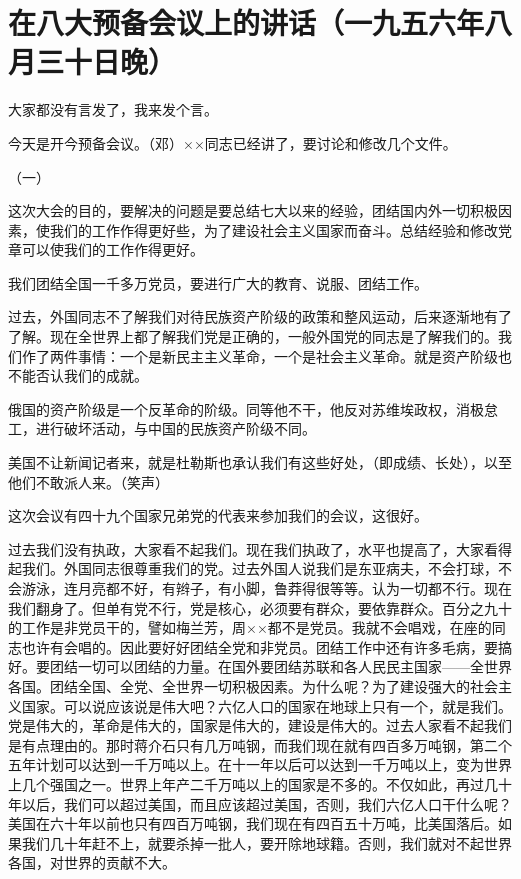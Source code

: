 \section[在八大预备会议上的讲话（一九五六年八月三十日晚）]{在八大预备会议上的讲话（一九五六年八月三十日晚）}


大家都没有言发了，我来发个言。

今天是开今预备会议。（邓）××同志已经讲了，要讨论和修改几个文件。

（一）

这次大会的目的，要解决的问题是要总结七大以来的经验，团结国内外一切积极因素，使我们的工作作得更好些，为了建设社会主义国家而奋斗。总结经验和修改党章可以使我们的工作作得更好。

我们团结全国一千多万党员，要进行广大的教育、说服、团结工作。

过去，外国同志不了解我们对待民族资产阶级的政策和整风运动，后来逐渐地有了了解。现在全世界上都了解我们党是正确的，一般外国党的同志是了解我们的。我们作了两件事情：一个是新民主主义革命，一个是社会主义革命。就是资产阶级也不能否认我们的成就。

俄国的资产阶级是一个反革命的阶级。同等他不干，他反对苏维埃政权，消极怠工，进行破坏活动，与中国的民族资产阶级不同。

美国不让新闻记者来，就是杜勒斯也承认我们有这些好处，（即成绩、长处），以至他们不敢派人来。（笑声）

这次会议有四十九个国家兄弟党的代表来参加我们的会议，这很好。

过去我们没有执政，大家看不起我们。现在我们执政了，水平也提高了，大家看得起我们。外国同志很尊重我们的党。过去外国人说我们是东亚病夫，不会打球，不会游泳，连月亮都不好，有辫子，有小脚，鲁莽得很等等。认为一切都不行。现在我们翻身了。但单有党不行，党是核心，必须要有群众，要依靠群众。百分之九十的工作是非党员干的，譬如梅兰芳，周××都不是党员。我就不会唱戏，在座的同志也许有会唱的。因此要好好团结全党和非党员。团结工作中还有许多毛病，要搞好。要团结一切可以团结的力量。在国外要团结苏联和各人民民主国家——全世界各国。团结全国、全党、全世界一切积极因素。为什么呢？为了建设强大的社会主义国家。可以说应该说是伟大吧？六亿人口的国家在地球上只有一个，就是我们。党是伟大的，革命是伟大的，国家是伟大的，建设是伟大的。过去人家看不起我们是有点理由的。那时蒋介石只有几万吨钢，而我们现在就有四百多万吨钢，第二个五年计划可以达到一千万吨以上。在十一年以后可以达到一千万吨以上，变为世界上几个强国之一。世界上年产二千万吨以上的国家是不多的。不仅如此，再过几十年以后，我们可以超过美国，而且应该超过美国，否则，我们六亿人口干什么呢？美国在六十年以前也只有四百万吨钢，我们现在有四百五十万吨，比美国落后。如果我们几十年赶不上，就要杀掉一批人，要开除地球籍。否则，我们就对不起世界各国，对世界的贡献不大。


